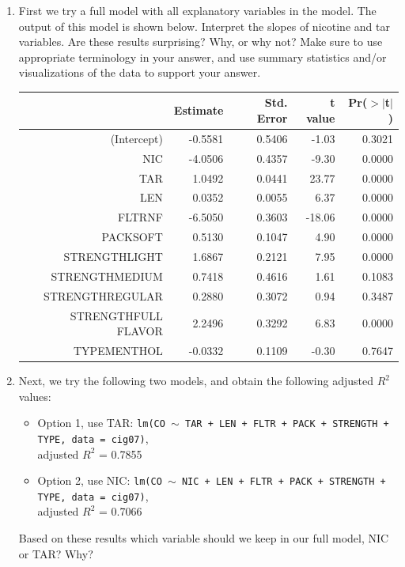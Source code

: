 \documentclass[11pt]{article}
\begin{document}
\begin{enumerate}
\item First we try a full model with all explanatory variables in the model. The output of this model is shown below. Interpret the slopes of nicotine and tar variables. Are these results surprising? Why, or why not? Make sure to use appropriate terminology in your answer, and use summary statistics and/or visualizations of the data to support your answer.
{\small
\begin{center}
\begin{tabular}{rrrrr}
  \hline
 & Estimate & Std. Error & t value & Pr($>$$|$t$|$) \\ 
  \hline
(Intercept) & -0.5581 & 0.5406 & -1.03 & 0.3021 \\ 
  NIC & -4.0506 & 0.4357 & -9.30 & 0.0000 \\ 
  TAR & 1.0492 & 0.0441 & 23.77 & 0.0000 \\ 
  LEN & 0.0352 & 0.0055 & 6.37 & 0.0000 \\ 
  FLTRNF & -6.5050 & 0.3603 & -18.06 & 0.0000 \\ 
  PACKSOFT & 0.5130 & 0.1047 & 4.90 & 0.0000 \\ 
  STRENGTHLIGHT & 1.6867 & 0.2121 & 7.95 & 0.0000 \\ 
  STRENGTHMEDIUM & 0.7418 & 0.4616 & 1.61 & 0.1083 \\ 
  STRENGTHREGULAR & 0.2880 & 0.3072 & 0.94 & 0.3487 \\ 
  STRENGTHFULL FLAVOR & 2.2496 & 0.3292 & 6.83 & 0.0000 \\ 
  TYPEMENTHOL & -0.0332 & 0.1109 & -0.30 & 0.7647 \\ 
   \hline
\end{tabular}
\end{center}
}
\item Next, we try the following two models, and obtain the following adjusted $R^2$ values:
\begin{itemize}
\item Option 1, use TAR: \texttt{lm(CO $\sim$ TAR + LEN + FLTR + PACK + STRENGTH + TYPE, data = cig07)}, \\
adjusted $R^2$ = 0.7855
\item Option 2, use NIC: \texttt{lm(CO $\sim$ NIC + LEN + FLTR + PACK + STRENGTH + TYPE, data = cig07)}, \\
adjusted $R^2$ = 0.7066
\end{itemize}
Based on these results which variable should we keep in our full model, NIC or TAR? Why?


\end{enumerate}
\end{document}
